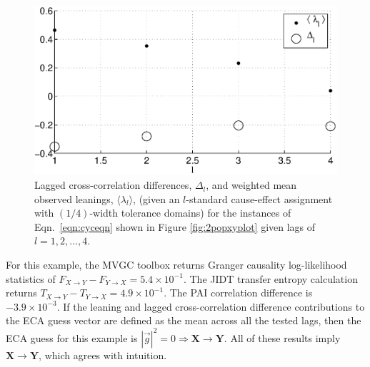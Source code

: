 \begin{figure}[ht]
\begin{center}
\includegraphics[scale=0.7]{CoupLogMapExample_LandLCC.eps} 
\end{center}
\caption{Lagged cross-correlation differences, $\Delta_l$, and weighted mean observed leanings, $\langle\lambda_l\rangle$, (given an $l$-standard cause-effect assignment with $(1/4)$-width tolerance domains) for the instances of Eqn.\ \ref{eqn:cyceqn} shown in Figure \ref{fig:2popxyplot} given lags of $l=1,2,\ldots,4$.}
\label{fig:2popxyLandLCC}
\end{figure}

For this example, the MVGC toolbox returns Granger causality log-likelihood statistics of $F_{X\rightarrow Y}-F_{Y\rightarrow X}=5.4\times 10^{-1}$.  The JIDT transfer entropy calculation returns $T_{X\rightarrow Y}-T_{Y\rightarrow X}=4.9\times 10^{-1}$.  The PAI correlation difference is $-3.9\times 10^{-3}$.  If the leaning and lagged cross-correlation difference contributions to the ECA guess vector are defined as the mean across all the tested lags, then the ECA guess for this example is $|\vec{g}|^2=0\Rightarrow \mathbf{X}\rightarrow\mathbf{Y}$.  All of these results imply $\mathbf{X}\rightarrow\mathbf{Y}$, which agrees with intuition.   

